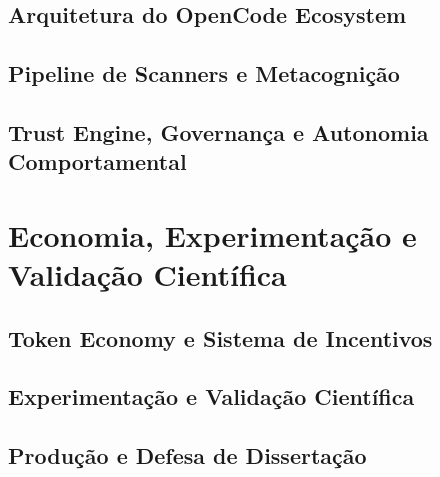 \documentclass[11pt,fleqn,oneside]{book}
\theoremstyle{definition}
\begin{document}
\chapter{Arquitetura do OpenCode Ecosystem}
\label{ch:arquitetura-opencode}


\newpage
\chapter{Pipeline de Scanners e Metacognição}
\label{ch:scanner-metacognicao}


\newpage
\chapter{Trust Engine, Governança e Autonomia Comportamental}
\label{ch:trust-governanca}


\part{Economia, Experimentação e Validação Científica}
\newpage
\chapter{Token Economy e Sistema de Incentivos}
\label{ch:token-economy}


\newpage
\chapter{Experimentação e Validação Científica}
\label{ch:experimentacao-validacao}


\newpage
\chapter{Produção e Defesa de Dissertação}
\label{ch:dissertacao-banca}


\end{document}
